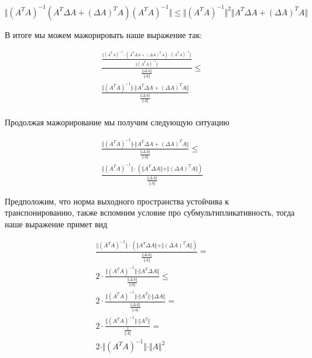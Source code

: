 \documentclass{article}
\begin{document}
    \begin{equation}
        \Vert  (A^{T} A)^{-1}  (A^{T} \Delta A + (\Delta A)^{T} A) (A^{T} A)^{-1} \Vert  \leq \Vert (A^{T} A)^{-1} \Vert^{2} \Vert A^{T} \Delta A + (\Delta A)^{T} A \Vert
    \end{equation}

    В итоге мы можем мажорировать наше выражение так:

    \[
    \begin{gathered}
        \frac{ \frac{\Vert  (A^{T} A)^{-1} \cdot (A^{T} \Delta A + (\Delta A)^{T} A) \cdot (A^{T} A)^{-1} \Vert }{\Vert (A^T A)^{-1} \Vert} }{ \frac{\Vert \Delta A \Vert}{\Vert A \Vert} } \leq \\
        \frac{ \Vert (A^{T} A)^{-1} \Vert \cdot \Vert A^{T} \Delta A + (\Delta A)^{T} A \Vert }{ \frac{\Vert \Delta A \Vert}{\Vert A \Vert} } \\
    \end{gathered}
    \]

    Продолжая мажорирование мы получим следующую ситуацию

    \[
    \begin{gathered}
        \frac{ \Vert (A^{T} A)^{-1} \Vert \cdot \Vert A^{T} \Delta A + (\Delta A)^{T} A \Vert }{ \frac{\Vert \Delta A \Vert}{\Vert A \Vert} } \leq \\
        \frac{ \Vert (A^{T} A)^{-1} \Vert \cdot ( \Vert A^{T} \Delta A \Vert + \Vert (\Delta A)^{T} A \Vert) }{ \frac{\Vert \Delta A \Vert}{\Vert A \Vert} }
    \end{gathered}
    \]

    Предположим, что норма выходного пространства устойчива к транспонированию, также вспомним условие про субмультипликативность, тогда наше выражение примет вид

    \[
        \begin{gathered}
            \frac{ \Vert (A^{T} A)^{-1} \Vert \cdot ( \Vert A^{T} \Delta A \Vert + \Vert (\Delta A)^{T} A \Vert) }{ \frac{\Vert \Delta A \Vert}{\Vert A \Vert} } = \\
            2 \cdot \frac{ \Vert (A^{T} A)^{-1} \Vert \cdot \Vert A^{T} \Delta A \Vert  }{ \frac{\Vert \Delta A \Vert}{\Vert A \Vert} } \leq \\
            2 \cdot \frac{ \Vert (A^{T} A)^{-1} \Vert \cdot \Vert A^{T} \Vert \cdot \Vert \Delta A \Vert  }{ \frac{\Vert \Delta A \Vert}{\Vert A \Vert} } = \\
            2 \cdot \frac{ \Vert (A^{T} A)^{-1} \Vert \cdot \Vert A^{T} \Vert  }{ \frac{1}{\Vert A \Vert} } = \\
            2 \cdot \Vert (A^{T} A)^{-1} \Vert \cdot \Vert A \Vert^{2}
        \end{gathered}
    \]
\end{document}
